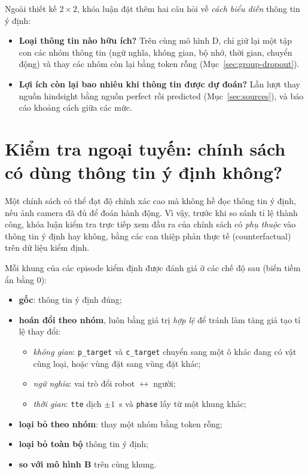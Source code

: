 Ngoài thiết kế $2\times2$, khóa luận đặt thêm hai câu hỏi về \emph{cách biểu diễn} thông tin ý định:
\begin{itemize}
  \item \textbf{Loại thông tin nào hữu ích?} Trên cùng mô hình D, chỉ giữ lại một tập con các nhóm thông tin (ngữ nghĩa, không gian, bộ nhớ, thời gian, chuyển động) và thay các nhóm còn lại bằng token rỗng (Mục~\ref{sec:group-dropout}).
  \item \textbf{Lợi ích còn lại bao nhiêu khi thông tin được dự đoán?} Lần lượt thay nguồn hindsight bằng nguồn perfect rồi predicted (Mục~\ref{sec:sources}), và báo cáo khoảng cách giữa các mức.
\end{itemize}

\section{Kiểm tra ngoại tuyến: chính sách có dùng thông tin ý định không?}
\label{sec:offline-checks}

Một chính sách có thể đạt độ chính xác cao mà không hề đọc thông tin ý định, nếu ảnh camera đã đủ để đoán hành động. Vì vậy, trước khi so sánh tỉ lệ thành công, khóa luận kiểm tra trực tiếp xem đầu ra của chính sách có \emph{phụ thuộc} vào thông tin ý định hay không, bằng các can thiệp phản thực tế (counterfactual) trên dữ liệu kiểm định.

Mỗi khung của các episode kiểm định được đánh giá ở các chế độ sau (biến tiềm ẩn bằng 0):
\begin{itemize}
  \item \textbf{gốc}: thông tin ý định đúng;
  \item \textbf{hoán đổi theo nhóm}, luôn bằng giá trị \emph{hợp lệ} để tránh làm tăng giả tạo tỉ lệ thay đổi:
    \begin{itemize}
      \item \emph{không gian}: \texttt{p\_target} và \texttt{c\_target} chuyển sang một ô khác đang có vật cùng loại, hoặc vùng đặt sang vùng đặt khác;
      \item \emph{ngữ nghĩa}: vai trò đổi robot $\leftrightarrow$ người;
      \item \emph{thời gian}: \texttt{tte} dịch $\pm1$~s và \texttt{phase} lấy từ một khung khác;
    \end{itemize}
  \item \textbf{loại bỏ theo nhóm}: thay một nhóm bằng token rỗng;
  \item \textbf{loại bỏ toàn bộ} thông tin ý định;
  \item \textbf{so với mô hình B} trên cùng khung.
\end{itemize}

